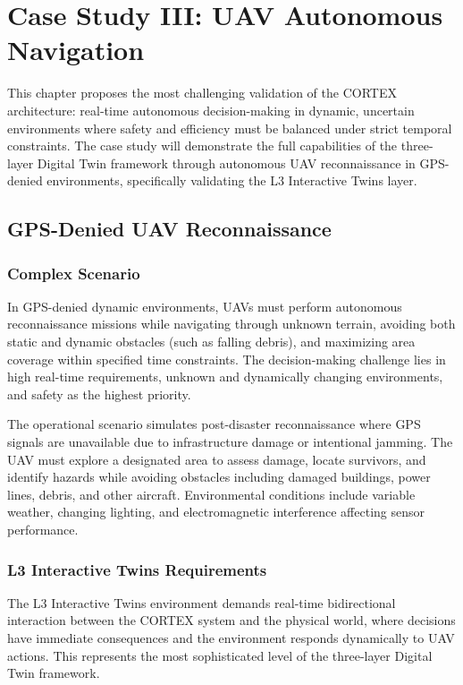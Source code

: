 
\chapter{Case Study III: UAV Autonomous Navigation} \label{chp:uav}

This chapter proposes the most challenging validation of the CORTEX architecture: real-time autonomous decision-making in dynamic, uncertain environments where safety and efficiency must be balanced under strict temporal constraints. The case study will demonstrate the full capabilities of the three-layer Digital Twin framework through autonomous UAV reconnaissance in GPS-denied environments, specifically validating the L3 Interactive Twins layer.

\section{GPS-Denied UAV Reconnaissance}

\subsection{Complex Scenario}

In GPS-denied dynamic environments, UAVs must perform autonomous reconnaissance missions while navigating through unknown terrain, avoiding both static and dynamic obstacles (such as falling debris), and maximizing area coverage within specified time constraints. The decision-making challenge lies in high real-time requirements, unknown and dynamically changing environments, and safety as the highest priority.

The operational scenario simulates post-disaster reconnaissance where GPS signals are unavailable due to infrastructure damage or intentional jamming. The UAV must explore a designated area to assess damage, locate survivors, and identify hazards while avoiding obstacles including damaged buildings, power lines, debris, and other aircraft. Environmental conditions include variable weather, changing lighting, and electromagnetic interference affecting sensor performance.

\subsection{L3 Interactive Twins Requirements}

The L3 Interactive Twins environment demands real-time bidirectional interaction between the CORTEX system and the physical world, where decisions have immediate consequences and the environment responds dynamically to UAV actions. This represents the most sophisticated level of the three-layer Digital Twin framework.

